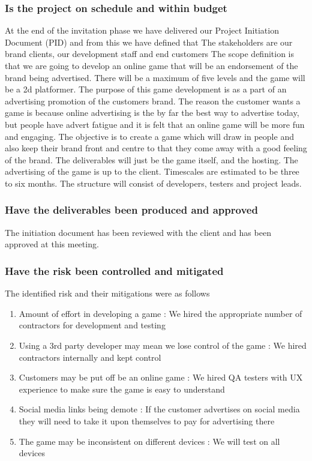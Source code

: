 \documentclass{article}
\begin{document}
\subsubsection{Is the project on schedule and within budget}
At the end of the invitation phase we have delivered our Project Initiation Document (PID) and from this we have defined that
The stakeholders are our brand clients, our development staff and end customers
The scope definition is that we are going to develop an online game that will be an endorsement of the brand being advertised. There will be a maximum of five levels and the game will be a 2d platformer.
The purpose of this game development is as a part of an advertising promotion of the customers brand. The reason the customer wants a game is because online advertising is the by far the best way to advertise today, but people have advert fatigue and it is felt that an online game will be more fun and engaging.
The objective is to create a game which will draw in people and also keep their brand front and centre to that they come away with a good feeling of the brand.
The deliverables will just be the game itself, and the hosting. The advertising of the game is up to the client.
Timescales are estimated to be three to six months.
The structure will consist of developers, testers and project leads.

\subsubsection{Have the deliverables been produced and approved}
The initiation document has been reviewed with the client and has been approved at this meeting.


\subsubsection{Have the risk been controlled and mitigated}
The identified risk and their mitigations were as follows
\begin{enumerate}
    \item Amount of effort in developing a game : We hired the appropriate number of contractors for development and testing
    \item Using a 3rd party developer may mean we lose control of the game : We hired contractors internally and kept control 
    \item Customers may be put off be an online game : We hired QA testers with UX experience to make sure the game is easy to understand
    \item Social media links being demote : If the customer advertises on social media they will need to take it upon themselves to pay for advertising there
    \item The game may be inconsistent on different devices : We will test on all devices
\end{enumerate}
\end{document}

